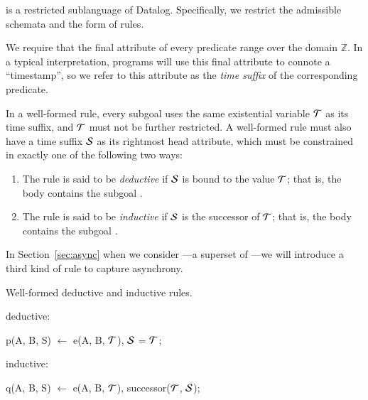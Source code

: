 \slang is a restricted sublanguage of Datalog.  Specifically, we restrict the
admissible schemata and the form of rules.

We require that the final attribute of every \slang
predicate range over the domain $\mathbb{Z}$.  In a typical
interpretation, \slang programs will use this final attribute to connote a
``timestamp'', so we refer to this attribute as the \emph{time suffix} of the
corresponding predicate.

%
%
In a well-formed \slang rule, every subgoal uses the same existential variable $\Tau$
as its time suffix, and $\Tau$ must not be further restricted.  A well-formed
\slang rule must also have a time suffix $\SDedalus$ as its rightmost head attribute, which must be
constrained in exactly one of the following two ways:
\begin{enumerate}
%
\item The rule is said to be \emph{deductive} if $\SDedalus$ is bound to the
value $\Tau$; that is, the body contains the subgoal \dedalus{$\SDedalus$ = $\Tau$}.
%
\item The rule is said to be {\em inductive} if $\SDedalus$ is the successor of
$\Tau$; that is, the body contains the subgoal .
%
\end{enumerate}

In Section~\ref{sec:async} when we consider \lang---a superset of \slang---we will
introduce a third kind of rule to capture asynchrony.

\begin{example}
Well-formed deductive and inductive rules.

deductive:\\
\begin{Dedalus}
p(A, B, S) \(\leftarrow\) e(A, B, \(\Tau\)), \(\SDedalus\) = \(\Tau\);
\end{Dedalus}
inductive:\\
\begin{Dedalus}
q(A, B, S) \(\leftarrow\) e(A, B, \(\Tau\)), successor(\(\Tau\), \(\SDedalus\));
\end{Dedalus}
\end{example}


